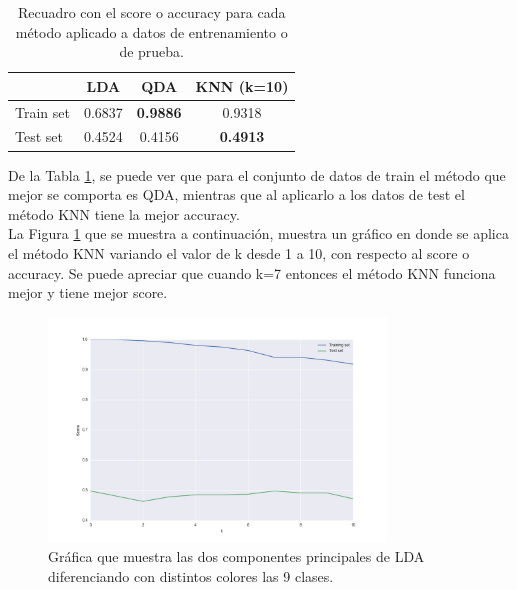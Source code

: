 \documentclass[letter, 10pt]{article}
\begin{document}
\begin{table}[!hbt] 
\begin{center}
\begin{tabular}{| l | c | c | c |} 
\hline
\textbf{} & \textbf{LDA} & \textbf{QDA} &\textbf{KNN (k=10)} \\ 
\hline 
Train set & 0.6837 & \textbf{0.9886} & 0.9318\\ 
Test set &0.4524 & 0.4156 & \textbf{0.4913}\\
\hline 
\end{tabular}
\caption{Recuadro con el score o accuracy para cada método aplicado a datos de entrenamiento o de prueba.} 
\label{table:score}
\end{center} 
\end{table}

De la Tabla \ref{table:score}, se puede ver que para el conjunto de datos de train el método que mejor se comporta es QDA, mientras que al aplicarlo a los datos de test el método KNN tiene la mejor accuracy.\\

La Figura \ref{G1.3} que se muestra a continuación, muestra un gráfico en donde se aplica el método KNN variando el valor de k desde 1 a 10, con respecto al score o accuracy. Se puede apreciar que cuando k=7 entonces el método KNN funciona mejor y tiene mejor score.\\

\begin{figure}[h!]
\begin{center}
\includegraphics[width=0.8\textwidth]{Images/figure_3.png}
\caption{Gráfica que muestra las dos componentes principales de LDA diferenciando con distintos colores las 9 clases.}
\label{G1.3}
\end{center}
\end{figure}
\end{document}
